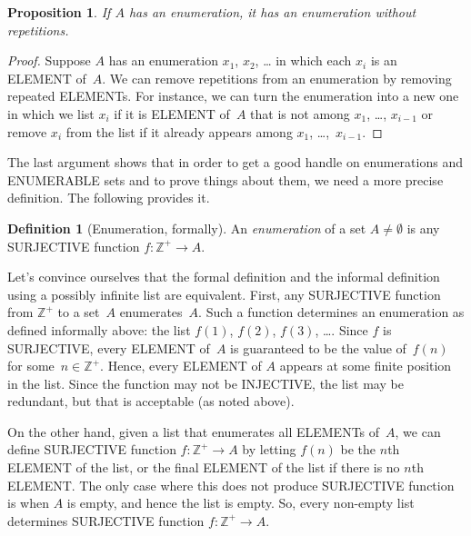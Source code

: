 \documentclass[10pt,a4paper]{article}
\newcommand*{\olup}[1]{\MakeUppercase{#1}}
\theoremstyle{plain}
\newtheorem{prop}[thm]{Proposition}
\theoremstyle{definition}
\newtheorem{defn}[thm]{Definition}
\theoremstyle{remark}
\newenvironment{explain}{}{}
\providecommand{\PosInt}{\mathbb{Z}^{+}}
\begin{document}
\begin{prop}
  If $A$ has an enumeration, it has an enumeration without
  repetitions.
\end{prop}

\begin{proof}
  Suppose $A$ has an enumeration $x_1$, $x_2$, \dots{} in which each
  $x_i$ is an \olup{element} of~$A$.  We can remove repetitions from an
  enumeration by removing repeated \olup{element}s. For instance, we can
  turn the enumeration into a new one in which we list $x_i$ if
  it is \olup{element} of~$A$ that is not among $x_1$, \dots,
  $x_{i-1}$ or remove $x_i$ from the list if it already appears among
  $x_1$, \dots,~$x_{i-1}$.
\end{proof}

The last argument shows that in order to get a good handle on
enumerations and \olup{enumerable} sets and to prove things about them,
we need a more precise definition.  The following provides it.

\begin{defn}[Enumeration, formally] 
An \emph{enumeration} of a set $A \neq \emptyset$ is any
\olup{surjective} function $f \colon \PosInt \to A$.
\end{defn}

\begin{explain}
Let's convince ourselves that the formal definition and the informal
definition using a possibly infinite list are equivalent. First, any
\olup{surjective} function from $\PosInt$ to a set~$A$ enumerates~$A$.
Such a function determines an enumeration as defined informally above:
the list $f(1)$, $f(2)$, $f(3)$, \dots. Since $f$ is \olup{surjective},
every \olup{element} of~$A$ is guaranteed to be the value of~$f(n)$ for
some~$n \in \PosInt$. Hence, every \olup{element} of $A$ appears at some
finite position in the list. Since the function may not be
\olup{injective}, the list may be redundant, but that is acceptable (as
noted above).

On the other hand, given a list that enumerates all \olup{element}s
of~$A$, we can define \olup{surjective} function $f\colon \PosInt \to A$
by letting $f(n)$ be the $n$th \olup{element} of the list, or the final
\olup{element} of the list if there is no $n$th \olup{element}. The only
case where this does not produce \olup{surjective} function is when $A$ is
empty, and hence the list is empty. So, every non-empty list
determines \olup{surjective} function $f\colon \PosInt \to A$.
\end{explain}
\end{document}
